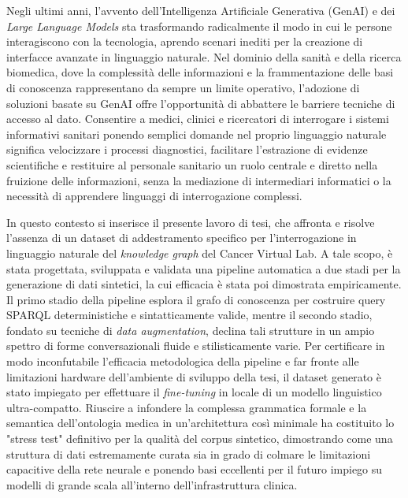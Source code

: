 \documentclass[12pt,a4paper,openright,twoside]{book}
\begin{document}
Negli ultimi anni, l'avvento dell'Intelligenza Artificiale Generativa (GenAI) e
dei \textit{Large Language Models} sta trasformando radicalmente il modo in cui
le persone interagiscono con la tecnologia, aprendo scenari inediti per la
creazione di interfacce avanzate in linguaggio naturale. Nel dominio della
sanità e della ricerca biomedica, dove la complessità delle informazioni e la
frammentazione delle basi di conoscenza rappresentano da sempre un limite
operativo, l'adozione di soluzioni basate su GenAI offre l'opportunità di
abbattere le barriere tecniche di accesso al dato. Consentire a medici, clinici
e ricercatori di interrogare i sistemi informativi sanitari ponendo semplici
domande nel proprio linguaggio naturale significa velocizzare i processi
diagnostici, facilitare l'estrazione di evidenze scientifiche e restituire al
personale sanitario un ruolo centrale e diretto nella fruizione delle
informazioni, senza la mediazione di intermediari informatici o la necessità di
apprendere linguaggi di interrogazione complessi.

In questo contesto si inserisce il presente lavoro di tesi, che affronta e
risolve l'assenza di un dataset di addestramento specifico per l'interrogazione
in linguaggio naturale del \textit{knowledge graph} del Cancer Virtual Lab. A
tale scopo, è stata progettata, sviluppata e validata una pipeline automatica a
due stadi per la generazione di dati sintetici, la cui efficacia è stata poi
dimostrata empiricamente. Il primo stadio della pipeline esplora il grafo di
conoscenza per costruire query SPARQL deterministiche e sintatticamente valide,
mentre il secondo stadio, fondato su tecniche di \textit{data augmentation},
declina tali strutture in un ampio spettro di forme conversazionali fluide e
stilisticamente varie. Per certificare in modo inconfutabile l'efficacia
metodologica della pipeline e far fronte alle limitazioni hardware dell'ambiente
di sviluppo della tesi, il dataset generato è stato impiegato per effettuare il
\textit{fine-tuning} in locale di un modello linguistico ultra-compatto.
Riuscire a infondere la complessa grammatica formale e la semantica
dell'ontologia medica in un'architettura così minimale ha costituito lo "stress
test" definitivo per la qualità del corpus sintetico, dimostrando come una
struttura di dati estremamente curata sia in grado di colmare le limitazioni
capacitive della rete neurale e ponendo basi eccellenti per il futuro impiego su
modelli di grande scala all'interno dell'infrastruttura clinica.
\end{document}
